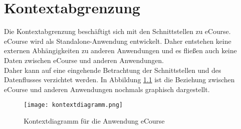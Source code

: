 
\chapter{Kontextabgrenzung}
Die Kontextabgrenzung beschäftigt sich mit den Schnittstellen zu eCourse.
eCourse wird als \gls{Standalone}-Anwendung entwickelt. Daher entstehen keine externen Abhängigkeiten zu anderen Anwendungen und es fließen auch keine Daten zwischen eCourse und anderen Anwendungen. \\
Daher kann auf eine eingehende Betrachtung der Schnittstellen und des Datenflusses verzichtet werden. In Abbildung \ref{fib:Kontext} ist die Beziehung zwischen eCourse und anderen Anwendungen nochmals graphisch dargestellt. 
\begin{figure}[H]
\centering
\texttt{[image: kontextdiagramm.png]}
\caption{Kontextdiagramm für die Anwendung eCourse}
\label{fib:Kontext}
\end{figure}
